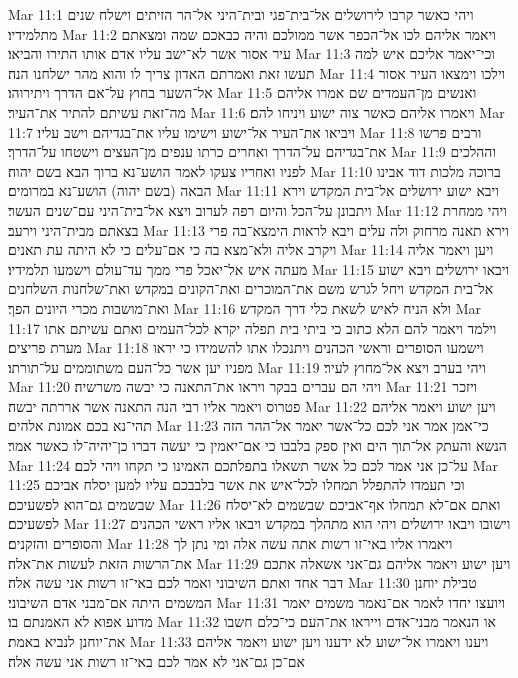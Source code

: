 Mar 11:1  ויהי כאשר קרבו לירושלים אל־בית־פגי ובית־היני אל־הר הזיתים וישלח שנים מתלמידיו׃
Mar 11:2  ויאמר אליהם לכו אל־הכפר אשר ממולכם והיה כבאכם שמה ומצאתם עיר אסור אשר לא־ישב עליו אדם אותו התירו והביאו׃
Mar 11:3  וכי־יאמר אליכם איש למה תעשו זאת ואמרתם האדון צריך לו והוא מהר ישלחנו הנה׃
Mar 11:4  וילכו וימצאו העיר אסור אל־השער בחוץ על־אם הדרך ויתירוהו׃
Mar 11:5  ואנשים מן־העמדים שם אמרו אליהם מה־זאת עשיתם להתיר את־העיר׃
Mar 11:6  ויאמרו אליהם כאשר צוה ישוע ויניחו להם׃
Mar 11:7  ויביאו את־העיר אל־ישוע וישימו עליו את־בגדיהם וישב עליו׃
Mar 11:8  ורבים פרשו את־בגדיהם על־הדרך ואחרים כרתו ענפים מן־העצים וישטחו על־הדרך׃
Mar 11:9  וההלכים לפניו ואחריו צעקו לאמר הושע־נא ברוך הבא בשם יהוה׃
Mar 11:10  ברוכה מלכות דוד אבינו הבאה (בשם יהוה) הושע־נא במרומים׃
Mar 11:11  ויבא ישוע ירושלים אל־בית המקדש וירא ויתבונן על־הכל והיום רפה לערוב ויצא אל־בית־היני עם־שנים העשר׃
Mar 11:12  ויהי ממחרת בצאתם מבית־היני וירעב׃
Mar 11:13  וירא תאנה מרחוק ולה עלים ויבא לראות הימצא־בה פרי ויקרב אליה ולא־מצא בה כי אם־עלים כי לא היתה עת תאנים׃
Mar 11:14  ויען ויאמר אליה מעתה איש אל־יאכל פרי ממך עד־עולם וישמעו תלמידיו׃
Mar 11:15  ויבאו ירושלים ויבא ישוע אל־בית המקדש ויחל לגרש משם את־המוכרים ואת־הקונים במקדש ואת־שלחנות השלחנים ואת־מושבות מכרי היונים הפך׃
Mar 11:16  ולא הניח לאיש לשאת כלי דרך המקדש׃
Mar 11:17  וילמד ויאמר להם הלא כתוב כי ביתי בית תפלה יקרא לכל־העמים ואתם עשיתם אתו מערת פריצים׃
Mar 11:18  וישמעו הסופרים וראשי הכהנים ויתנכלו אתו להשמידו כי יראו מפניו יען אשר כל־העם משתוממים על־תורתו׃
Mar 11:19  ויהי בערב ויצא אל־מחוץ לעיר׃
Mar 11:20  ויהי הם עברים בבקר ויראו את־התאנה כי יבשה משרשיה׃
Mar 11:21  ויזכר פטרוס ויאמר אליו רבי הנה התאנה אשר אררתה יבשה׃
Mar 11:22  ויען ישוע ויאמר אליהם תהי־נא בכם אמונת אלהים׃
Mar 11:23  כי־אמן אמר אני לכם כל־אשר יאמר אל־ההר הזה הנשא והעתק אל־תוך הים ואין ספק בלבבו כי אם־יאמין כי יעשה דברו כן־יהיה־לו כאשר אמר׃
Mar 11:24  על־כן אני אמר לכם כל אשר תשאלו בתפלתכם האמינו כי תקחו ויהי לכם׃
Mar 11:25  וכי תעמדו להתפלל תמחלו לכל־איש את אשר בלבבכם עליו למען יסלח אביכם שבשמים גם־הוא לפשעיכם׃
Mar 11:26  ואתם אם־לא תמחלו אף־אביכם שבשמים לא־יסלח לפשעיכם׃
Mar 11:27  וישובו ויבאו ירושלים ויהי הוא מתהלך במקדש ויבאו אליו ראשי הכהנים והסופרים והזקנים׃
Mar 11:28  ויאמרו אליו באי־זו רשות אתה עשה אלה ומי נתן לך את־הרשות הזאת לעשות את־אלה׃
Mar 11:29  ויען ישוע ויאמר אליהם גם־אני אשאלה אתכם דבר אחד ואתם השיבוני ואמר לכם באי־זו רשות אני עשה אלה׃
Mar 11:30  טבילת יוחנן המשמים היתה אם־מבני אדם השיבוני׃
Mar 11:31  ויועצו יחדו לאמר אם־נאמר משמים יאמר מדוע אפוא לא האמנתם בו׃
Mar 11:32  או הנאמר מבני־אדם וייראו את־העם כי־כלם חשבו את־יוחנן לנביא באמת׃
Mar 11:33  ויענו ויאמרו אל־ישוע לא ידענו ויען ישוע ויאמר אליהם אם־כן גם־אני לא אמר לכם באי־זו רשות אני עשה אלה׃
